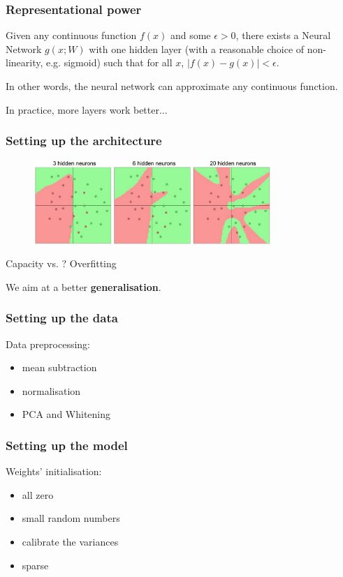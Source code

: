 \begin{frame}
	\frametitle{Representational power}

	Given any continuous function $f(x)$ and some $\epsilon > 0$, there exists a Neural Network $g(x;W)$ 
	with one hidden layer (with a reasonable choice of non-linearity, e.g. sigmoid) such that for 
	all $x$, $\mid f(x)-g(x) \mid <\epsilon$. 

	\vskip 0.5cm

	In other words, the neural network can approximate any continuous function.

	\vskip 0.5cm

	In practice, more layers work better...

\end{frame}

\begin{frame}
	\frametitle{Setting up the architecture}

	\begin{figure}
        	\includegraphics[width=0.8\textwidth]{Pics/layer_sizes}
      	\end{figure}

	Capacity vs. ? \pause Overfitting

	We aim at a better \textbf{generalisation}.

\end{frame}


\begin{frame}
	\frametitle{Setting up the data}

	Data preprocessing:
	\begin{itemize}
		\item mean subtraction
		\item normalisation
		\item PCA and Whitening
	\end{itemize}

\end{frame}


\begin{frame}
        \frametitle{Setting up the model}

        Weights' initialisation:
        \begin{itemize}
                \item all zero
                \item small random numbers
                \item calibrate the variances
		\item sparse
        \end{itemize}

\end{frame}

